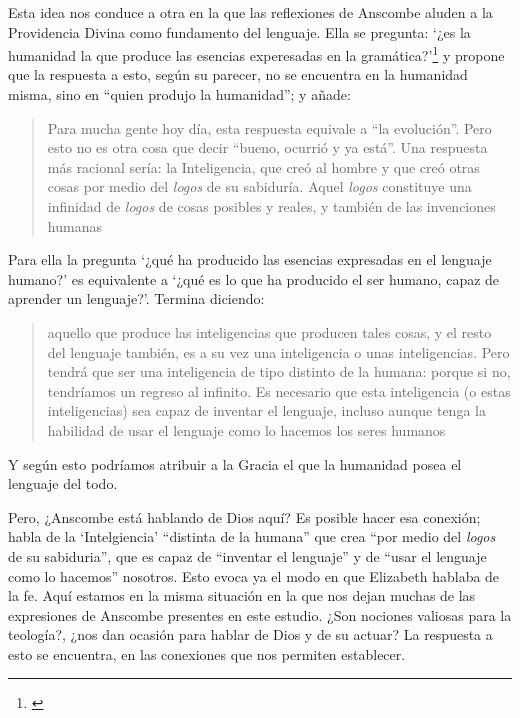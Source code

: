 Esta idea nos conduce a otra en la que las reflexiones de Anscombe aluden a la Providencia Divina como fundamento del lenguaje. Ella se pregunta: \enquote*{¿es la humanidad la que produce las esencias experesadas en la gramática?}\footnote{\Cite[Cf.][72]{torralbaynubiola2005fayeh:esencia}} y propone que la respuesta a esto, según su parecer, no se encuentra en la humanidad misma, sino en \enquote{quien produjo la humanidad}; y añade: \blockquote[{\Cite[73]{torralbaynubiola2005fayeh:esencia}}]{Para mucha gente hoy día, esta respuesta equivale a ``la evolución''. Pero esto no es otra cosa que decir ``bueno, ocurrió y ya está''. Una respuesta más racional sería: la Inteligencia, que creó al hombre y que creó otras cosas por medio del \emph{logos} de su sabiduría. Aquel \emph{logos} constituye una infinidad de \emph{logos} de cosas posibles y reales, y también de las invenciones humanas}. Para ella la pregunta \enquote*{¿qué ha producido las esencias expresadas en el lenguaje humano?} es equivalente a \enquote*{¿qué es lo que ha producido el ser humano, capaz de aprender un lenguaje?}. Termina diciendo: \blockquote[{\Cite[74]{torralbaynubiola2005fayeh:esencia}}]{aquello que produce las inteligencias que producen tales cosas, y el resto del lenguaje también, es a su vez una inteligencia o unas inteligencias. Pero tendrá que ser una inteligencia de tipo distinto de la humana: porque si no, tendríamos un regreso al infinito. Es necesario que esta inteligencia (o estas inteligencias) sea capaz de inventar el lenguaje, incluso aunque tenga la habilidad de usar el lenguaje como lo hacemos los seres humanos}. Y según esto podríamos atribuir a la Gracia el que la humanidad posea el lenguaje del todo.

Pero, ¿Anscombe está hablando de Dios aquí? Es posible hacer esa conexión; habla de la `Intelgiencia' ``distinta de la humana'' que crea ``por medio del \emph{logos} de su sabiduria'', que es capaz de ``inventar el lenguaje'' y de ``usar el lenguaje como lo hacemos'' nosotros. Esto evoca ya el modo en que Elizabeth hablaba de la fe. Aquí estamos en la misma situación en la que nos dejan muchas de las expresiones de Anscombe presentes en este estudio. ¿Son nociones valiosas para la teología?, ¿nos dan ocasión para hablar de Dios y de su actuar? La respuesta a esto se encuentra, en las conexiones que nos permiten establecer.

